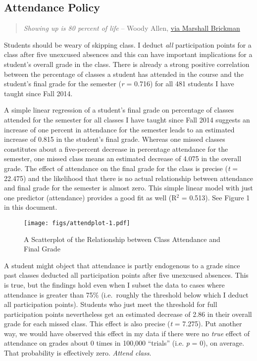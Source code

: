 \documentclass[11pt,]{article}
\makeatletter
\def\maxwidth{\ifdim\Gin@nat@width>\linewidth\linewidth
\else\Gin@nat@width\fi}
\let\Oldincludegraphics\includegraphics
\renewcommand{\includegraphics}[1]{\Oldincludegraphics[width=\maxwidth]{#1}}
\makeatother
\begin{document}
\hypertarget{attendance-policy}{%
\subsection{Attendance Policy}\label{attendance-policy}}

\begin{quote}
\emph{Showing up is 80 percent of life} -- Woody Allen,
\href{http://quoteinvestigator.com/2013/06/10/showing-up/\#note-6553-1}{via
Marshall Brickman}
\end{quote}

Students should be weary of skipping class. I deduct \emph{all}
participation points for a class after five unexcused absences and this
can have important implications for a student's overall grade in the
class. There is already a strong positive correlation between the
percentage of classes a student has attended in the course and the
student's final grade for the semester (\emph{r} = 0.716) for all 481
students I have taught since Fall 2014.

A simple linear regression of a student's final grade on percentage of
classes attended for the semester for all classes I have taught since
Fall 2014 suggests an increase of one percent in attendance for the
semester leads to an estimated increase of 0.815 in the student's final
grade. Whereas one missed classes constitutes about a five-percent
decrease in percentage attendance for the semester, one missed class
means an estimated decrease of 4.075 in the overall grade. The effect of
attendance on the final grade for the class is precise (\emph{t} =
22.475) and the likelihood that there is no actual relationship between
attendance and final grade for the semester is almost zero. This simple
linear model with just one predictor (attendance) provides a good fit as
well (R\(^2\) = 0.513). See Figure 1 in this document.

\begin{figure}
\centering
\texttt{[image: figs/attendplot-1.pdf]}
\caption{A Scatterplot of the Relationship between Class Attendance and
Final Grade}
\end{figure}

A student might object that attendance is partly endogenous to a grade
since past classes deducted all participation points after five
unexcused absences. This is true, but the findings hold even when I
subset the data to cases where attendance is greater than 75\%
(i.e.~roughly the threshold below which I deduct all participation
points). Students who just meet the threshold for full participation
points nevertheless get an estimated decrease of 2.86 in their overall
grade for each missed class. This effect is also precise (\emph{t} =
7.275). Put another way, we would have observed this effect in my data
if there were no \emph{true} effect of attendance on grades about 0
times in 100,000 ``trials'' (i.e. \emph{p} = 0), on average. That
probability is effectively zero. \emph{Attend class}.
\end{document}

